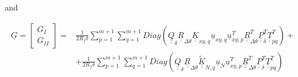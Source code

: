 and

\begin{equation}\label{paperA:eq:gIandIIlong}
\begin{split}
\underline{G}=\begin{bmatrix}
G_{I} \\
G_{II}
\end{bmatrix}=&\frac{1}{2R_{f}\delta}\sum_{p=1}^{m+1}\sum_{q=1}^{m+1}Diag\left(\underline{\underline{Q}}_{\delta}\underline{\underline{R}}_{\Delta\theta}\underline{\underline{K}}_{xy,q}\underline{u}_{xy,q}\underline{u}_{xy,p}^{T}\underline{\underline{R}}_{\Delta\theta}^{T}\underline{\underline{P}}_{\delta}^{T}\underline{\underline{T}}_{pq}^{T}\right)+\\
&+\frac{1}{2R_{f}\delta}\sum_{p=1}^{m+1}\sum_{q=1}^{m+1}Diag\left(\underline{\underline{Q}}_{\delta}\underline{\underline{R}}_{\Delta\theta}\underline{\underline{\widetilde{K}}}_{N,q}\underline{u}_{N}\underline{u}_{xy,p}^{T}\underline{\underline{R}}_{\Delta\theta}^{T}\underline{\underline{P}}_{\delta}^{T}\underline{\underline{T}}_{pq}^{T}\right)
\end{split}
\end{equation}

